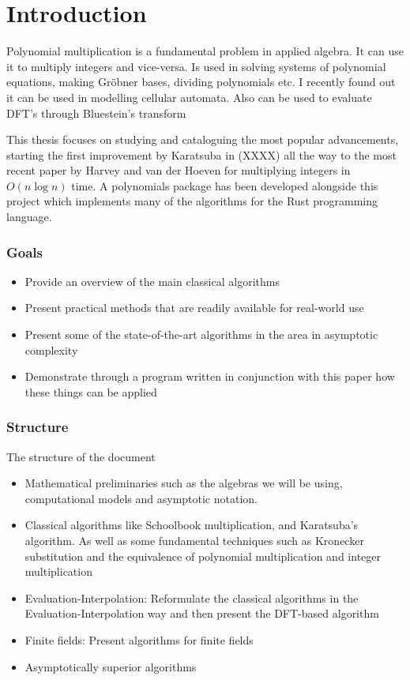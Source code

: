 \chapter{Introduction}\label{introduction}


Polynomial multiplication is a fundamental problem in applied algebra. It can use it to multiply integers and vice-versa. Is used in solving systems of polynomial equations, making Gr\"{o}bner bases, dividing polynomials etc. I recently found out it can be used in modelling cellular automata. Also can be used to evaluate DFT's through Bluestein's transform

This thesis focuses on studying and cataloguing the most popular advancements, starting the first improvement by Karatsuba in (XXXX) all the way to the most recent paper by Harvey and van der Hoeven for multiplying integers in $O(n\log n)$ time. A polynomials package has been developed alongside this project which implements many of the algorithms for the Rust programming language.

\subsection{Goals}%
\label{sub:goals}

\begin{itemize}
    \item Provide an overview of the main classical algorithms
    \item Present practical methods that are readily available for real-world use
    \item Present some of the state-of-the-art algorithms in the area in asymptotic complexity
    \item Demonstrate through a program written in conjunction with this paper how these things can be applied
\end{itemize}


\subsection{Structure}%
\label{sub:Structure}

The structure of the document

\begin{itemize}
    \item Mathematical preliminaries such as the algebras we will be using, computational models and asymptotic notation.
    \item Classical algorithms like Schoolbook multiplication, and Karatsuba's algorithm. As well as some fundamental techniques such as Kronecker substitution and the equivalence of polynomial multiplication and integer multiplication
    \item Evaluation-Interpolation: Reformulate the classical algorithms in the Evaluation-Interpolation way and then present the DFT-based algorithm
    \item Finite fields: Present algorithms for finite fields
    \item Asymptotically superior algorithms
\end{itemize}

